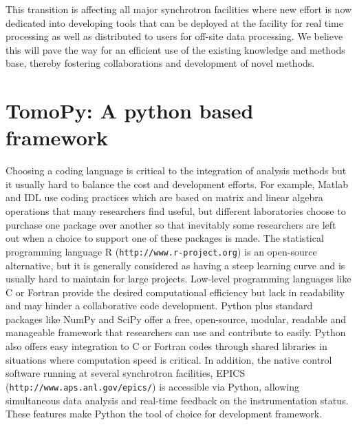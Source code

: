 \documentclass[pdf]{iucr}              %
\begin{document}
This transition is affecting all major synchrotron facilities where new effort is now dedicated into developing tools that can be deployed at the facility for real time processing as well as distributed to users for off-site data processing. We believe this will pave the way for an efficient use of the existing knowledge and methods base, thereby fostering collaborations and development of novel methods.

\section{TomoPy: A python based framework}

Choosing a coding language is critical to the integration of analysis methods but it usually hard to balance the cost and development efforts. For example, Matlab and IDL use coding practices which are based on matrix and linear algebra operations that many researchers find useful, but different laboratories choose to purchase one package over another so that inevitably some researchers are left out when a choice to support one of these packages is made. The statistical programming language R (\texttt{http://www.r-project.org}) is an open-source alternative, but it is generally considered as having a steep learning curve and is usually hard to maintain for large projects. Low-level programming languages like C or Fortran provide the desired computational efficiency but lack in readability and may hinder a collaborative code development. Python plus standard packages like NumPy and SciPy offer a free, open-source, modular, readable and manageable framework that researchers can use and contribute to easily.  Python also offers easy integration to C or Fortran codes through shared libraries in situations where computation speed is critical.  In addition, the native  control software running at several synchrotron facilities, EPICS (\texttt{http://www.aps.anl.gov/epics/}) is accessible via Python, allowing simultaneous data analysis and real-time feedback on the instrumentation status. These features make Python the tool of choice for development framework.

\end{document}

